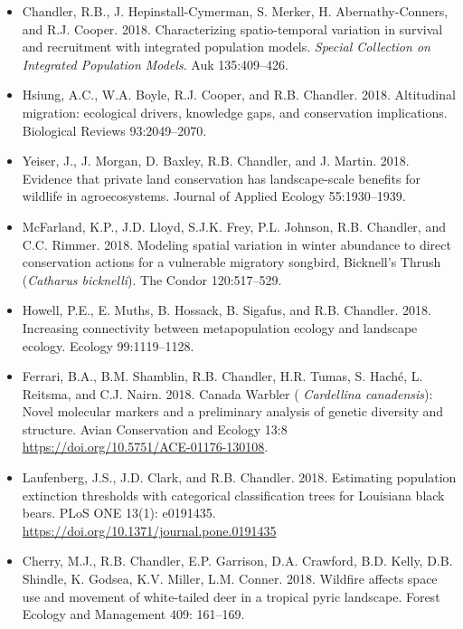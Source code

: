 \documentclass[12pt]{article}
\begin{document}
\begin{itemize}
\item Chandler, R.B., J. Hepinstall-Cymerman, S. Merker, H. Abernathy-Conners,
  and R.J. Cooper. 2018. Characterizing spatio-temporal 
  variation in survival and recruitment with integrated population
  models. {\it Special Collection on Integrated Population
    Models}. Auk 135:409--426. 

\item Hsiung, A.C., W.A. Boyle, R.J. Cooper, and
  R.B. Chandler. 2018. Altitudinal migration: ecological drivers,
  knowledge gaps, and conservation implications. Biological Reviews 
  93:2049--2070. 

\item Yeiser, J., J. Morgan, D. Baxley, R.B. Chandler, and
  J. Martin. 2018. Evidence that private land conservation
  has landscape-scale benefits for wildlife in agroecosystems. Journal
  of Applied Ecology 55:1930--1939. 

\item McFarland, K.P., J.D. Lloyd, S.J.K. Frey, P.L. Johnson,
  R.B. Chandler, and C.C. Rimmer. 2018. Modeling spatial
  variation in winter abundance to direct conservation actions for a
  vulnerable migratory songbird, Bicknell’s Thrush ({\it Catharus
    bicknelli}). The Condor 120:517--529. 

\item Howell, P.E., E. Muths, B. Hossack, B. Sigafus, and
  R.B. Chandler. 2018. Increasing connectivity between 
  metapopulation ecology and landscape ecology. Ecology 99:1119--1128.  
  
\item Ferrari, B.A., B.M. Shamblin, R.B. Chandler, H.R. Tumas, S. Hach\'e,
  L. Reitsma, and C.J. Nairn. 2018. Canada Warbler ({\it
  Cardellina canadensis}): Novel molecular markers and a preliminary
  analysis of genetic diversity and structure. Avian Conservation and
  Ecology 13:8 \url{https://doi.org/10.5751/ACE-01176-130108}.

\item Laufenberg, J.S., J.D. Clark, and
  R.B. Chandler. 2018. Estimating population extinction thresholds 
  with categorical classification trees for Louisiana black
  bears. PLoS ONE 13(1): e0191435.
  \url{https://doi.org/10.1371/journal.pone.0191435}

\item Cherry, M.J., R.B. Chandler, E.P. Garrison, D.A. Crawford,
  B.D. Kelly, D.B. Shindle, K. Godsea, K.V. Miller,
  L.M. Conner. 2018. Wildfire affects space use and movement of
  white-tailed deer in a tropical pyric landscape. Forest Ecology and
  Management 409: 161--169. 


\end{itemize}
\end{document}
